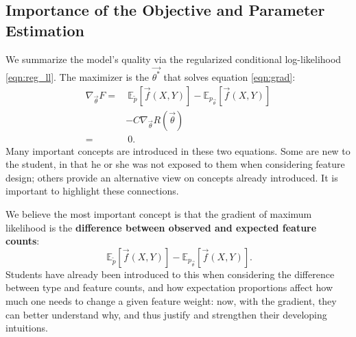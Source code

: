 \documentclass[11pt,letterpaper]{article}
\newcommand{\empirical}[0]{\ensuremath{\tilde{p}}}
\newcommand{\Data}[0]{\ensuremath{\mathcal{D}}}
\begin{document}


\subsection{Importance of the Objective and Parameter Estimation} %

We summarize the model's quality via the regularized conditional
log-likelihood \eqref{eqn:reg_ll}.  
The maximizer is the $\vec{\theta^*}$ that solves equation \eqref{eqn:grad}:
\begin{equation}
\begin{aligned}
\nabla_{\vec{\theta}} F
 = &
\ \mathbb{E}_{\empirical{}}\left[\vec{f}(X,Y)\right] 
- \mathbb{E}_{{p_{\vec{\theta}}}}\left[\vec{f}(X,Y)\right]\\
 & - C \nabla_{\vec{\theta}}R(\vec{\theta})
\label{eqn:grad} \\
 = &\ 0.
\end{aligned}
\end{equation}
Many important concepts are introduced in these two equations. Some are new to the student, in that he or
she was not exposed to them when considering feature design; others provide an alternative view
on concepts already introduced. It is important to highlight these connections.

We believe the most important concept is that the gradient of
maximum likelihood is the \textbf{difference 
between observed and expected feature counts}:
\begin{equation}
\ \mathbb{E}_{\empirical{}}\left[\vec{f}(X,Y)\right] 
- \mathbb{E}_{p_{\vec{\theta}}}\left[\vec{f}(X,Y)\right].
\label{eqn:obsexp} 
\end{equation}
Students have already been introduced to this when considering the difference between type and 
feature counts, and how expectation proportions affect how much one needs to change a given feature weight: 
now, with the gradient, they can better understand why, and thus justify and strengthen their developing intuitions.
\end{document}

